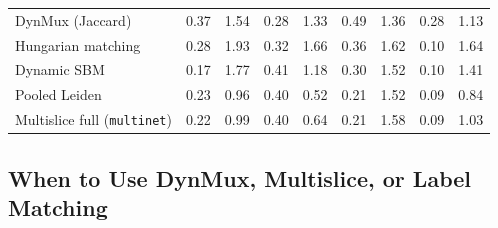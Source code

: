 \documentclass[11pt, letterpaper]{article}
\begin{document}
\begin{table}[t]
\begin{tabular}{lcccccccc}
DynMux (Jaccard) & 0.37 & 1.54 & 0.28 & 1.33 & 0.49 & 1.36 & 0.28 & 1.13 \\
Hungarian matching & 0.28 & 1.93 & 0.32 & 1.66 & 0.36 & 1.62 & 0.10 & 1.64 \\
Dynamic SBM & 0.17 & 1.77 & 0.41 & 1.18 & 0.30 & 1.52 & 0.10 & 1.41 \\
Pooled Leiden & 0.23 & 0.96 & 0.40 & 0.52 & 0.21 & 1.52 & 0.09 & 0.84 \\
Multislice full (\texttt{multinet}) & 0.22 & 0.99 & 0.40 & 0.64 & 0.21 & 1.58 & 0.09 & 1.03 \\
\bottomrule
\end{tabular}
\end{table}

\subsection{When to Use DynMux, Multislice, or Label Matching}
\end{document}
